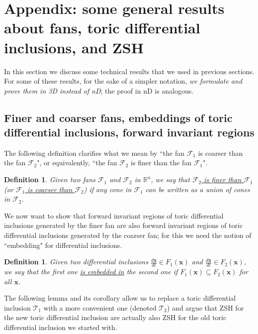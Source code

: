 \documentclass[12pt,letterpaper]{article}
\newtheorem{defn}[thm]{Definition}
\newcommand{\T}{\mathcal{T}}
\newcommand{\F}{\mathcal{F}}
\newcommand{\RR}{\mathbb{R}}
\begin{document}
\bigskip

\newpage

\section{Appendix: some general results about fans, toric differential inclusions,  and ZSH}

In this section we discuss some technical results that we used in previous sections. For some of these results, for the sake of a simpler notation, {\em we formulate and prove them in 3D instead of nD}; the proof in nD is analogous. 

\subsection{Finer and coarser fans, embeddings of toric differential inclusions, forward invariant regions}

The following definition clarifies what we mean by ``the fan $\F_1$ is coarser than the fan $\F_2$", or equivalently, ``the fan $\F_2$ is finer than the fan $\F_1$". 

\begin{defn}
%
Given two  fans $\F_1$ and $\F_2$ in $\RR^n$, we say that \underline{$\F_2$ is finer than $\F_1$} (or \underline{$\F_1$ is coarser than $\F_2$}) if  any cone in $\F_1$ can be written as a union of cones in $\F_2$.
%
\end{defn}

We now want to show that forward invariant regions of toric differential inclusions generated by the finer fan are also forward invariant regions of toric differential inclusions generated by the  coarser fan; for this we need the notion of ``embedding" for differential inclusions.

\begin{defn}
%
Given two differential inclusions $\frac{d{\mathbf x}}{dt} \in F_1({\mathbf x})$ and $\frac{d{\mathbf x}}{dt} \in F_2({\mathbf x})$, we say that the first one \underline{is embedded in} the second one if $F_1({\mathbf x}) \subseteq F_2({\mathbf x})$ for all ${\mathbf x}$.
%
\end{defn}

The following lemma and its corollary allow us  to replace a toric differential inclusion $\T_1$ with a more convenient one (denoted $\T_2$) and argue that  ZSH for the new toric differential inclusion are actually also ZSH for the old toric differential inclusion we started with.
\end{document}
